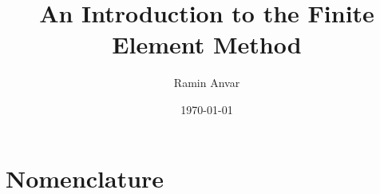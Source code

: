 
\title{An Introduction to the Finite Element Method}
\author{Ramin Anvar}
\date{\today}
\maketitle


\tableofcontents

\listoffigures

\chapter*{Nomenclature}	\label{cha:nomenclature}
\renewcommand*{\arraystretch}{1.25}	%
\setlength{\glsdescwidth}{0.40\textwidth}
\setlength{\glspagelistwidth}{0.08\textwidth}
\printglossary[type=symbols,style=altlong4col]
